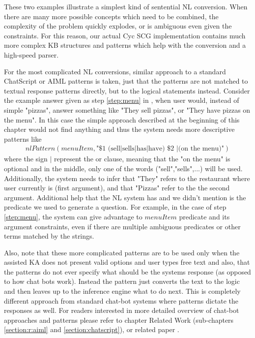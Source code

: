 These two examples illustrate a simplest kind of sentential NL conversion. 
When there are many more possible concepts which need to be combined, the 
complexity of the problem quickly explodes, or is ambiguous even given the 
constraints. For this reason, our actual Cyc SCG implementation contains much 
more complex KB structures and patterns which help with the conversion and a 
high-speed parser.

For the most complicated NL conversions, similar approach to a standard 
ChatScript or AIML patterns\parencite{Wilcox2011,Wallace2013} is taken, just 
that the patterns are not matched to textual response patterns directly, but 
to the logical statements instead. Consider the example answer given as step 
\ref{step:menu} in \autocite{tab:conversation1}, when user would, instead of 
simple "pizzas", answer something like "They sell pizzas", or "They have 
pizzas on the menu". In this case the simple approach described at the 
beginning of this chapter would not find anything and thus the system needs 
more descriptive patterns like
\begin{equation}\label{nl:complexPattern}
\begin{gathered}
nlPattern(menuItem,\text{"\$1 (sell|sells|has|have) \$2 |(on the menu)"})
\end{gathered}
\end{equation}
where the sign $|$ represent the or clause, meaning that the "on the menu" is
optional and in the middle, only one of the words ("sell","sells",...) will
be used. Additionally, the system needs to infer that "They" refers to the
restaurant where user currently is (first argument), and that "Pizzas" refer 
to the the second argument.
Additional help that the NL system has and we didn't mention is the predicate
we used to generate a question. For example, in the case of step 
\ref{step:menu}, the system can give advantage to $menuItem$ predicate and its
argument constraints, even if there are multiple ambiguous predicates or other
terms matched by the strings.

Also, note that these more complicated patterns are to be used only when the 
assisted KA does not present valid options and user types free text and also, that
the patterns do not ever specify what should be the systems response (as opposed
to how chat bots work). Instead the pattern just converts the text to the logic
and then leaves up to the inference engine what to do next. This is completely 
different approach from standard chat-bot systems where patterns dictate the 
responses as well. For readers interested in more detailed overview of chat-bot
approaches and patterns please refer to chapter Related Work (sub-chapters
\ref{section:r:aiml} and \ref{section:chatscript}), or related paper
\parencite{Bradesko2012}.

